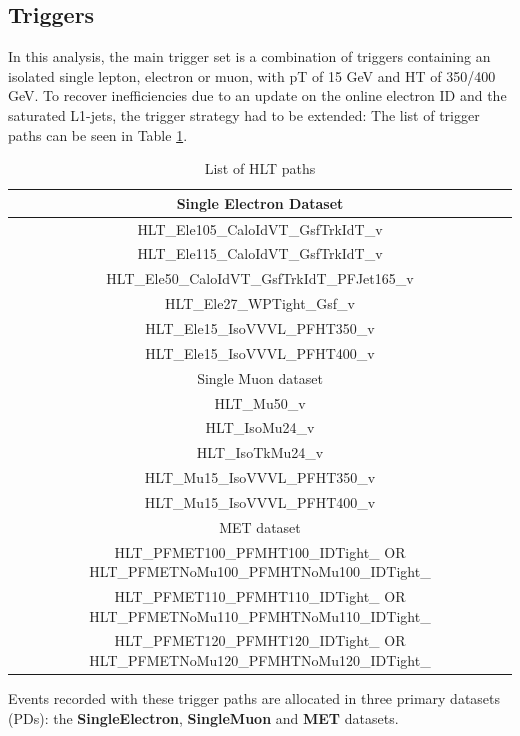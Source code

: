 \subsection{Triggers}
\label{sec:triggers}
In this analysis, the main trigger set is a combination of triggers containing an isolated single lepton, electron or muon, with pT of 15 GeV and HT of 350/400 GeV.  To recover inefficiencies due to an update on the online electron ID and the saturated L1-jets, the trigger strategy had to be extended: The list of trigger paths can be seen in Table \ref{tab:triggers}.
\renewcommand{\arraystretch}{1.5}
\begin{table}[ht]
\begin{center}
\begin{tabular}{|c|}\hline
Single Electron Dataset \\
\hline
\hline
      HLT\_Ele105\_CaloIdVT\_GsfTrkIdT\_v \\
      HLT\_Ele115\_CaloIdVT\_GsfTrkIdT\_v \\
      HLT\_Ele50\_CaloIdVT\_GsfTrkIdT\_PFJet165\_v \\
      HLT\_Ele27\_WPTight\_Gsf\_v \\
      HLT\_Ele15\_IsoVVVL\_PFHT350\_v \\
      HLT\_Ele15\_IsoVVVL\_PFHT400\_v \\
\hline
Single Muon dataset \\
\hline
\hline
      HLT\_Mu50\_v \\
      HLT\_IsoMu24\_v \\
      HLT\_IsoTkMu24\_v \\
      HLT\_Mu15\_IsoVVVL\_PFHT350\_v \\
      HLT\_Mu15\_IsoVVVL\_PFHT400\_v \\
\hline
MET dataset \\
\hline
\hline
      HLT\_PFMET100\_PFMHT100\_IDTight\_ OR  HLT\_PFMETNoMu100\_PFMHTNoMu100\_IDTight\_ \\
      HLT\_PFMET110\_PFMHT110\_IDTight\_ OR  HLT\_PFMETNoMu110\_PFMHTNoMu110\_IDTight\_  \\
      HLT\_PFMET120\_PFMHT120\_IDTight\_ OR HLT\_PFMETNoMu120\_PFMHTNoMu120\_IDTight\_  \\
\hline
\end{tabular}
\end{center}
\caption{List of HLT paths}\label{tab:triggers}
\end{table}
\renewcommand{\arraystretch}{1}
Events recorded with these trigger paths are allocated in three primary datasets (PDs): the \textbf{SingleElectron}, \textbf{SingleMuon} and \textbf{MET} datasets.
